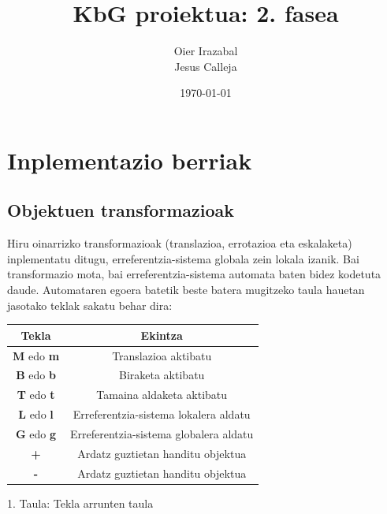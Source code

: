 \documentclass[12pt]{article}
\title{KbG proiektua: 2. fasea}
\author{
        Oier Irazabal\\
        Jesus Calleja
}
\date{\today}
\newcommand{\tekla}[1] {\textbf{#1}}
\begin{document}
\maketitle


\tableofcontents

\pagebreak



\section{Inplementazio berriak}\label{intro}

\subsection{Objektuen transformazioak}

Hiru oinarrizko transformazioak (translazioa, errotazioa eta eskalaketa) inplementatu ditugu, erreferentzia-sistema globala zein lokala izanik.
Bai transformazio mota, bai erreferentzia-sistema automata baten bidez kodetuta daude. Automataren egoera batetik beste batera mugitzeko taula hauetan jasotako teklak sakatu behar dira:\\

\begin{center}

\begin{tabular}{|c|c|}
																				\hline
	Tekla							& Ekintza								\\	\hline
	\tekla{M} edo \tekla{m}		& Translazioa aktibatu					\\	\hline
	\tekla{B} edo \tekla{b}		& Biraketa aktibatu						\\	\hline
	\tekla{T} edo \tekla{t}		& Tamaina aldaketa aktibatu				\\	\hline
	\tekla{L} edo \tekla{l}		& Erreferentzia-sistema lokalera aldatu	\\	\hline
	\tekla{G} edo \tekla{g}		& Erreferentzia-sistema globalera aldatu	\\	\hline
	\tekla{+}						& Ardatz guztietan handitu objektua	\\	\hline
	\tekla{-}						& Ardatz guztietan handitu objektua	\\	\hline
\end{tabular}

\vspace{0.3cm}
1. Taula: Tekla arrunten taula
\end{center}
\end{document}
